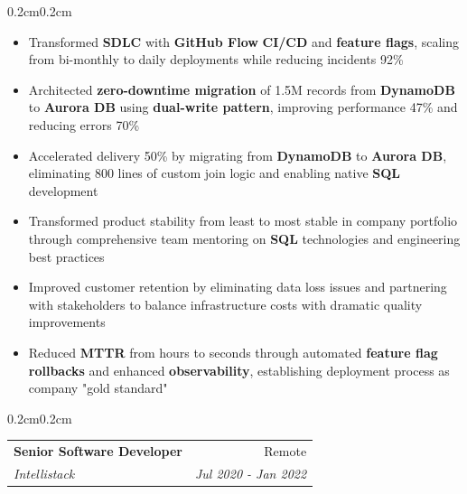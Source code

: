 \documentclass[10pt, letterpaper]{article}
\makeatletter
\newenvironment{highlights}{
    \begin{itemize}[
        topsep=0.10 cm,
        parsep=0.10 cm,
        partopsep=0pt,
        itemsep=0pt,
        leftmargin=0.4 cm + 10pt
    ]
}{
    \end{itemize}
}
\newenvironment{onecolentry}{
    \begin{adjustwidth}{0.2cm}{0.2cm}
}{
    \end{adjustwidth}
}
\newcommand{\jobentry}[4]{
    \begin{onecolentry}
        \noindent
        \begin{tabularx}{\textwidth}{@{}X r@{}}
            \textbf{#1} & #4\\
            \textit{#2} & \textit{#3}
        \end{tabularx}
        \vspace{0.05cm}
    \end{onecolentry}
}
\makeatother
\begin{document}
    \vspace{0.10cm}
    \begin{onecolentry}
        \begin{highlights}
            \item Transformed \textbf{SDLC} with \textbf{GitHub Flow} \textbf{CI/CD} and \textbf{feature flags}, scaling from bi-monthly to daily deployments while reducing incidents 92\%
            \item Architected \textbf{zero-downtime migration} of 1.5M records from \textbf{DynamoDB} to \textbf{Aurora DB} using \textbf{dual-write pattern}, improving performance 47\% and reducing errors 70\%
            \item Accelerated delivery 50\% by migrating from \textbf{DynamoDB} to \textbf{Aurora DB}, eliminating 800 lines of custom join logic and enabling native \textbf{SQL} development
            \item Transformed product stability from least to most stable in company portfolio through comprehensive team mentoring on \textbf{SQL} technologies and engineering best practices
            \item Improved customer retention by eliminating data loss issues and partnering with stakeholders to balance infrastructure costs with dramatic quality improvements
            \item Reduced \textbf{MTTR} from hours to seconds through automated \textbf{feature flag rollbacks} and enhanced \textbf{observability}, establishing deployment process as company "gold standard"
        \end{highlights}
    \end{onecolentry}
    
    \vspace{0.3cm}
    \jobentry{Senior Software Developer}{Intellistack}{Jul 2020 - Jan 2022}{Remote}
\end{document}
